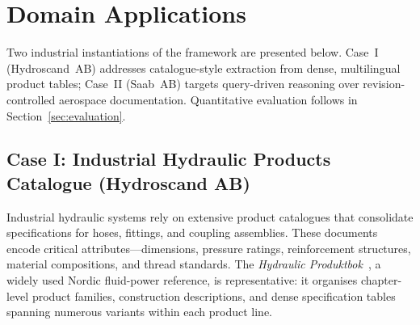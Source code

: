 \documentclass[largeformat]{interact}
\begin{document}



\section{Domain Applications}
\label{sec:domain_applications}
Two industrial instantiations of the framework are presented below. Case~I (Hydroscand~AB) addresses catalogue-style extraction from dense, multilingual product tables; Case~II (Saab~AB) targets query-driven reasoning over revision-controlled aerospace documentation. Quantitative evaluation follows in Section~\ref{sec:evaluation}.

\subsection{Case I: Industrial Hydraulic Products Catalogue (Hydroscand AB)}
\label{subsec:hydroscand_case}
Industrial hydraulic systems rely on extensive product catalogues that consolidate specifications for hoses, fittings, and coupling assemblies. These documents encode critical attributes---dimensions, pressure ratings, reinforcement structures, material compositions, and thread standards. The \emph{Hydraulic Produktbok}~\cite{hydroscand2020produktbok}, a widely used Nordic fluid-power reference, is representative: it organises chapter-level product families, construction descriptions, and dense specification tables spanning numerous variants within each product line.
\end{document}
